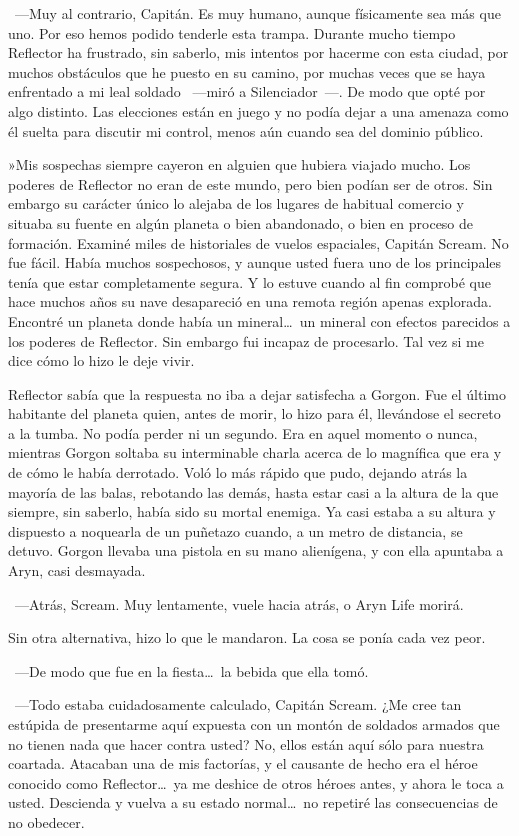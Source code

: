 ~---Muy al contrario, Capitán. Es muy humano, aunque físicamente sea más que uno. Por eso hemos podido tenderle esta trampa. Durante mucho tiempo Reflector ha frustrado, sin saberlo, mis intentos por hacerme con esta ciudad, por muchos obstáculos que he puesto en su camino, por muchas veces que se haya enfrentado a mi leal soldado ~---miró a Silenciador~---. De modo que opté por algo distinto. Las elecciones están en juego y no podía dejar a una amenaza como él suelta para discutir mi control, menos aún cuando sea del dominio público.

»Mis sospechas siempre cayeron en alguien que hubiera viajado mucho. Los poderes de Reflector no eran de este mundo, pero bien podían ser de otros. Sin embargo su carácter único lo alejaba de los lugares de habitual comercio y situaba su fuente en algún planeta o bien abandonado, o bien en proceso de formación. Examiné miles de historiales de vuelos espaciales, Capitán Scream. No fue fácil. Había muchos sospechosos, y aunque usted fuera uno de los principales tenía que estar completamente segura. Y lo estuve cuando al fin comprobé que hace muchos años su nave desapareció en una remota región apenas explorada. Encontré un planeta donde había un mineral\dots\ un mineral con efectos parecidos a los poderes de Reflector. Sin embargo fui incapaz de procesarlo. Tal vez si me dice cómo lo hizo le deje vivir.

Reflector sabía que la respuesta no iba a dejar satisfecha a Gorgon. Fue el último habitante del planeta quien, antes de morir, lo hizo para él, llevándose el secreto a la tumba. No podía perder ni un segundo. Era en aquel momento o nunca, mientras Gorgon soltaba su interminable charla acerca de lo magnífica que era y de cómo le había derrotado. Voló lo más rápido que pudo, dejando atrás la mayoría de las balas, rebotando las demás, hasta estar casi a la altura de la que siempre, sin saberlo, había sido su mortal enemiga. Ya casi estaba a su altura y dispuesto a noquearla de un puñetazo cuando, a un metro de distancia, se detuvo. Gorgon llevaba una pistola en su mano alienígena, y con ella apuntaba a Aryn, casi desmayada.

~---Atrás, Scream. Muy lentamente, vuele hacia atrás, o Aryn Life morirá.

Sin otra alternativa, hizo lo que le mandaron. La cosa se ponía cada vez peor.

~---De modo que fue en la fiesta\dots\ la bebida que ella tomó.

~---Todo estaba cuidadosamente calculado, Capitán Scream. ¿Me cree tan estúpida de presentarme aquí expuesta con un montón de soldados armados que no tienen nada que hacer contra usted? No, ellos están aquí sólo para nuestra coartada. Atacaban una de mis factorías, y el causante de hecho era el héroe conocido como Reflector\dots\ ya me deshice de otros héroes antes, y ahora le toca a usted. Descienda y vuelva a su estado normal\dots\ no repetiré las consecuencias de no obedecer.

